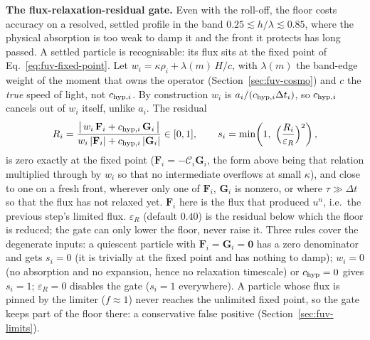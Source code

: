 \textbf{The flux-relaxation-residual gate.} Even with the roll-off, the
floor costs accuracy on a resolved, settled profile in the band
$0.25\lesssim h/\lambda\lesssim0.85$, where the physical absorption is
too weak to damp it and the front it protects has long passed. A settled
particle is recognisable: its flux sits at the fixed point of
Eq.~\ref{eq:fuv-fixed-point}. Let $w_i = \kappa\rho_i + \lambda(m)\,H/c$,
with $\lambda(m)$ the band-edge weight of the moment that owns the
operator (Section~\ref{sec:fuv-cosmo}) and $c$ the \emph{true} speed of
light, not $c_{{\rm hyp},i}$. By construction $w_i$ is
$a_i/(c_{{\rm hyp},i}\Delta t_i)$, so $c_{{\rm hyp},i}$ cancels out of
$w_i$ itself, unlike $a_i$. The residual
\begin{equation}
  R_i = \frac{\big|\,w_i\,\mathbf F_i + c_{{\rm hyp},i}\,\mathbf G_i\,\big|}
             {w_i\,|\mathbf F_i| + c_{{\rm hyp},i}\,|\mathbf G_i|}
  \in[0,1] , \qquad
  s_i = \min\!\left(1,\ \Big(\frac{R_i}{\varepsilon_R}\Big)^2\right) ,
  \label{eq:fuv-diss-gate}
\end{equation}
is zero exactly at the fixed point ($\mathbf F_i = -\mathcal C_i\mathbf
G_i$, the form above being that relation multiplied through by $w_i$ so
that no intermediate overflows at small $\kappa$), and close to one on
a fresh front, wherever only one of $\mathbf F_i$, $\mathbf G_i$ is
nonzero, or where $\tau\gg\Delta t$ so that the flux has not relaxed
yet. $\mathbf F_i$ here is the flux that produced $u^n$, i.e.\ the
previous step's limited flux. $\varepsilon_R$ (default
$0.40$) is the residual below which the floor is reduced; the gate can
only lower the floor, never raise it. Three rules cover the degenerate
inputs: a quiescent particle with $\mathbf F_i = \mathbf G_i = \mathbf 0$
has a zero denominator and gets $s_i = 0$ (it is trivially at the fixed
point and has nothing to damp); $w_i = 0$ (no absorption and no
expansion, hence no relaxation timescale) or $c_{\rm hyp} = 0$ gives
$s_i = 1$; $\varepsilon_R = 0$ disables the gate ($s_i = 1$
everywhere). A particle whose flux is pinned by the limiter ($f\approx1$)
never reaches the unlimited fixed point, so the gate keeps part of the
floor there: a conservative false positive (Section~\ref{sec:fuv-limits}).

